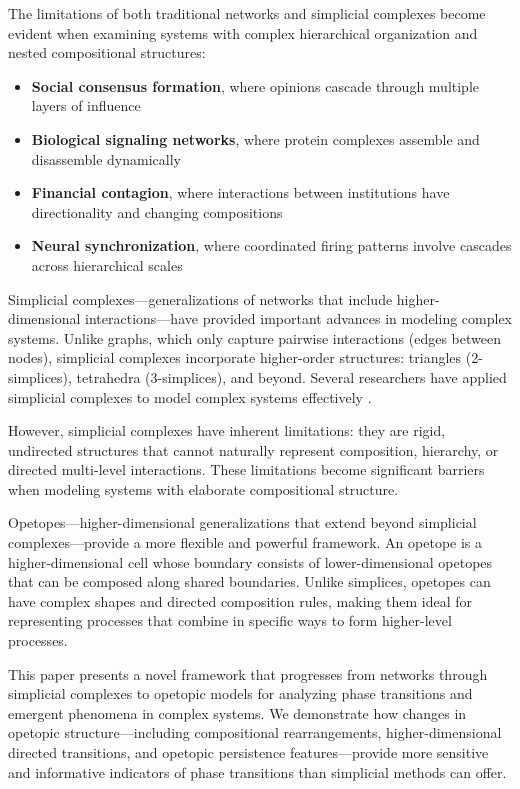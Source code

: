 The limitations of both traditional networks and simplicial complexes become evident when examining systems with complex hierarchical organization and nested compositional structures:

\begin{itemize}[leftmargin=*]
  \item \textbf{Social consensus formation}, where opinions cascade through multiple layers of influence \citep{watts1998collective}
  \item \textbf{Biological signaling networks}, where protein complexes assemble and disassemble dynamically \citep{strogatz2001exploring, giovannoni2017dynamic}
  \item \textbf{Financial contagion}, where interactions between institutions have directionality and changing compositions \citep{farmer2009economy}
  \item \textbf{Neural synchronization}, where coordinated firing patterns involve cascades across hierarchical scales \citep{bar2008dynamics, linde2021operad}
\end{itemize}

Simplicial complexes—generalizations of networks that include higher-dimensional interactions—have provided important advances in modeling complex systems. Unlike graphs, which only capture pairwise interactions (edges between nodes), simplicial complexes incorporate higher-order structures: triangles (2-simplices), tetrahedra (3-simplices), and beyond. Several researchers have applied simplicial complexes to model complex systems effectively \citep{petri2014homological, giusti2016two, sizemore2018importance}.

However, simplicial complexes have inherent limitations: they are rigid, undirected structures that cannot naturally represent composition, hierarchy, or directed multi-level interactions. These limitations become significant barriers when modeling systems with elaborate compositional structure.

Opetopes—higher-dimensional generalizations that extend beyond simplicial complexes—provide a more flexible and powerful framework. An opetope is a higher-dimensional cell whose boundary consists of lower-dimensional opetopes that can be composed along shared boundaries. Unlike simplices, opetopes can have complex shapes and directed composition rules, making them ideal for representing processes that combine in specific ways to form higher-level processes.

This paper presents a novel framework that progresses from networks through simplicial complexes to opetopic models for analyzing phase transitions and emergent phenomena in complex systems. We demonstrate how changes in opetopic structure—including compositional rearrangements, higher-dimensional directed transitions, and opetopic persistence features—provide more sensitive and informative indicators of phase transitions than simplicial methods can offer.